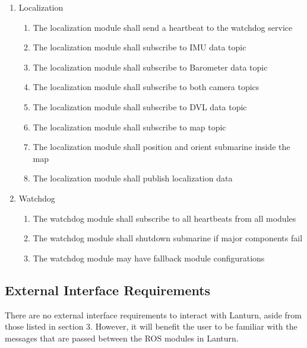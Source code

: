 \begin{enumerate}
    \item Localization 
        \begin{enumerate}
            \item The localization module shall send a heartbeat to the watchdog service  
            \item The localization module shall subscribe to IMU data topic 
            \item The localization module shall subscribe to Barometer data topic 
            \item The localization module shall subscribe to both camera topics 
            \item The localization module shall subscribe to DVL data topic 
            \item The localization module shall subscribe to map topic 
            \item The localization module shall position and orient submarine inside the map 
            \item The localization module shall publish localization data
        \end{enumerate}

    \item Watchdog 
        \begin{enumerate}
            \item The watchdog module shall subscribe to all heartbeats from all modules 
            \item The watchdog module shall shutdown submarine if major components fail 
            \item The watchdog module may have fallback module configurations
        \end{enumerate}
\end{enumerate}

\subsection{External Interface Requirements}
\label{sec:external-interface}

There are no external interface requirements to interact with Lanturn, aside
from those listed in section 3. However, it will benefit the user to be
familiar with the messages that are passed between the ROS modules in Lanturn.
\par

